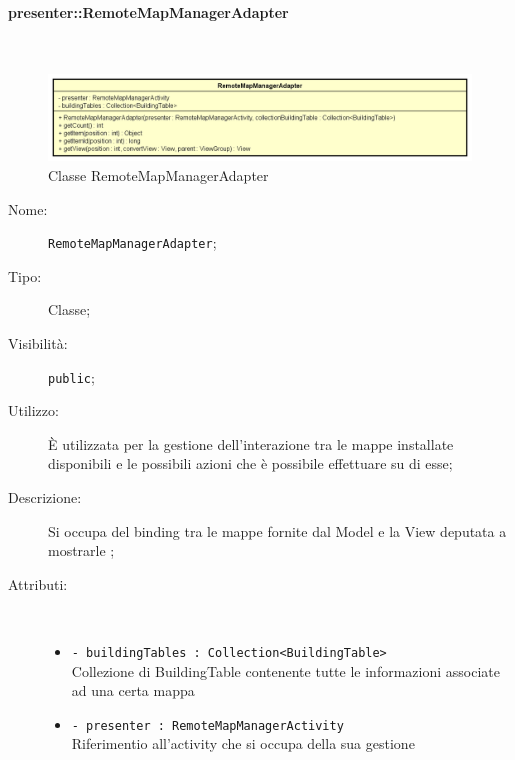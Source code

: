 \documentclass[../DefinizioneDiProdotto.tex]{subfiles}
\begin{document}
\paragraph{presenter::RemoteMapManagerAdapter}
\
\begin{figure}[H]
	\centering
	\includegraphics[width=\maxwidth]{img/RemoteMapManagerAdapter.png}
	\caption{Classe RemoteMapManagerAdapter}\label{fig:presenter::RemoteMapManagerAdapter} 
\end{figure}
\begin{description}
	\item[Nome:] \texttt{RemoteMapManagerAdapter};
	\item[Tipo:] Classe;
	\item[Visibilità:] \texttt{public};
	\item[Utilizzo:] È utilizzata per la gestione dell'interazione tra le mappe installate disponibili e le possibili azioni che è possibile effettuare su di esse;
	\item[Descrizione:] Si occupa del binding tra le mappe fornite dal Model e la View deputata a mostrarle
	;
	\item[Attributi:] \
	\begin{itemize}
		\item \texttt{- buildingTables : Collection<BuildingTable>}\\
		Collezione di BuildingTable contenente tutte le informazioni associate ad una certa mappa
		
		\item \texttt{- presenter : RemoteMapManagerActivity}\\
		Riferimentio all'activity che si occupa della sua gestione
		

\end{itemize}
\end{description}
\end{document}
